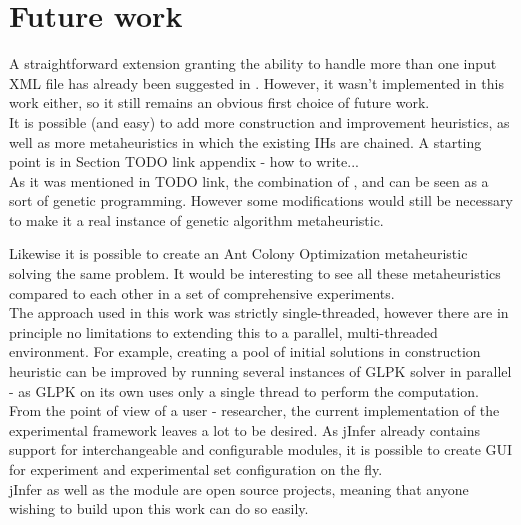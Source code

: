 \chapter{Future work}

A straightforward extension granting the ability to handle more than one input XML file has already been suggested in \cite{fidax}. However, it wasn't implemented in this work either, so it still remains an obvious first choice of future work.\\

It is possible (and easy) to add more construction and improvement heuristics, as well as more metaheuristics in which the existing IHs are chained. A starting point is in Section TODO link appendix - how to write...\\

As it was mentioned in TODO link, the combination of ,  and  can be seen as a sort of genetic programming. However some modifications would still be necessary to make it a real instance of genetic algorithm metaheuristic.

Likewise it is possible to create an Ant Colony Optimization metaheuristic solving the same problem. It would be interesting to see all these metaheuristics compared to each other in a set of comprehensive experiments.\\

The approach used in this work was strictly single-threaded, however there are in principle no limitations to extending this to a parallel, multi-threaded environment. For example, creating a pool of initial solutions in  construction heuristic can be improved by running several instances of GLPK solver in parallel - as GLPK on its own uses only a single thread to perform the computation.\\

From the point of view of a user - researcher, the current implementation of the experimental framework leaves a lot to be desired. As jInfer already contains support for interchangeable and configurable modules, it is possible to create GUI for experiment and experimental set configuration on the fly.\\

jInfer as well as the  module are open source projects, meaning that anyone wishing to build upon this work can do so easily.
